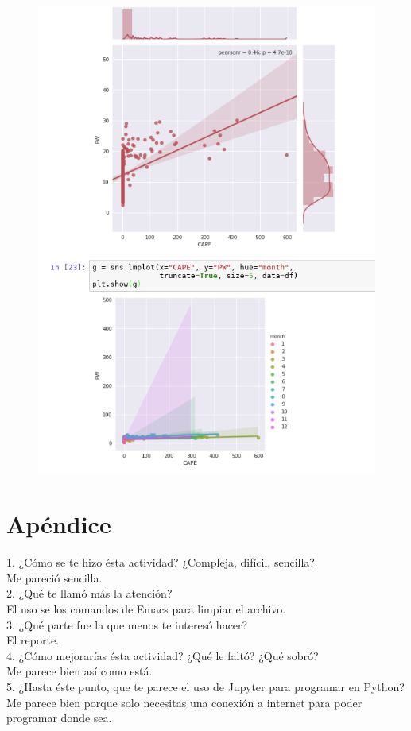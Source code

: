 \documentclass{article}
\begin{document}
\begin{figure}[H]
	\centering
    \includegraphics[width=\linewidth]{p5.png}
\end{figure}
\section{Apéndice}
1. ¿Cómo se te hizo ésta actividad? ¿Compleja, difícil, sencilla?\\
Me pareció sencilla.\\
2. ¿Qué te llamó más la atención?\\
El uso se los comandos de Emacs para limpiar el archivo.\\
3. ¿Qué parte fue la que menos te interesó hacer?\\
El reporte.\\
4. ¿Cómo mejorarías ésta actividad? ¿Qué le faltó? ¿Qué sobró?\\
Me parece bien así como está.\\
5. ¿Hasta éste punto, que te parece el uso de Jupyter para programar en Python?\\
Me parece bien porque solo necesitas una conexión a internet para poder programar donde sea.\\
\end{document}
